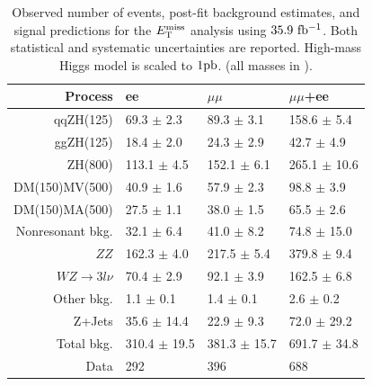 \setlength{\tabcolsep}{12pt}
\begin{table}[hbtp]
  \caption{Observed number of events, post-fit background estimates, and signal 
  predictions for the $E_\mathrm{T}^{\mathrm{miss}}$ analysis using $35.9~\mathrm{fb^{-1}}$. Both statistical and systematic uncertainties are reported.
  High-mass Higgs model is scaled to $1\mathrm{pb}$.
  (all masses in \GeV).
  \label{tab:zhinvsel}}
  \begin{center}
{\footnotesize
  \begin{tabular}{rlll}
\hline 
Process & ee & $\mu\mu$ & $\mu\mu$+ee \\
\hline
qqZH(125)             &   69.3 $\pm$  2.3 &   89.3 $\pm$  3.1 &  158.6 $\pm$    5.4 \\
ggZH(125)             &   18.4 $\pm$  2.0 &   24.3 $\pm$  2.9 &   42.7 $\pm$    4.9 \\
ZH(800)               &  113.1 $\pm$  4.5 &  152.1 $\pm$  6.1 &  265.1 $\pm$   10.6 \\
DM(150)MV(500)        &   40.9 $\pm$  1.6 &   57.9 $\pm$  2.3 &   98.8 $\pm$    3.9 \\
DM(150)MA(500)        &   27.5 $\pm$  1.1 &   38.0 $\pm$  1.5 &   65.5 $\pm$    2.6 \\
\hline
Nonresonant bkg.      &   32.1 $\pm$  6.4 &   41.0 $\pm$  8.2 &   74.8 $\pm$	15.0 \\ 
$ZZ$                  &  162.3 $\pm$  4.0 &  217.5 $\pm$  5.4 &  379.8 $\pm$	 9.4 \\ 
$WZ\rightarrow3l\nu$  &   70.4 $\pm$  2.9 &   92.1 $\pm$  3.9 &  162.5 $\pm$	 6.8 \\ 
Other bkg.            &    1.1 $\pm$  0.1 &    1.4 $\pm$  0.1 &    2.6 $\pm$	 0.2 \\ 
Z+Jets                &   35.6 $\pm$ 14.4 &   22.9 $\pm$  9.3 &   72.0 $\pm$	29.2 \\ 
\hline 
Total bkg.            &  310.4 $\pm$ 19.5 &  381.3 $\pm$ 15.7 &  691.7 $\pm$   34.8 \\
\hline 
Data                  &  292              &  396              &  688                 \\
\hline
  \end{tabular}
}
  \end{center}
\end{table}
